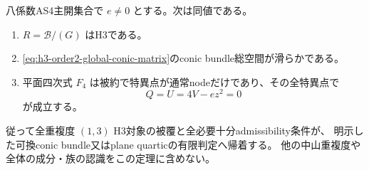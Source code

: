 \begin{theorem}
\label{thm:h3-order2-complete-conic-admissibility}
八係数AS4主開集合で $e\ne0$ とする。次は同値である。
\begin{enumerate}
\item $R=\mathcal B/(G)$ はH3である。
\item \eqref{eq:h3-order2-global-conic-matrix}のconic bundle総空間が滑らかである。
\item 平面四次式 $F_4$ は被約で特異点が通常nodeだけであり、その全特異点で
\[
 Q=U=4V-ez^2=0
\]
が成立する。
\end{enumerate}
従って全重複度 $(1,3)$ H3対象の被覆と全必要十分admissibility条件が、
明示した可換conic bundle又はplane quarticの有限判定へ帰着する。
他の中山重複度や全体の成分・族の認識をこの定理に含めない。
\end{theorem}
